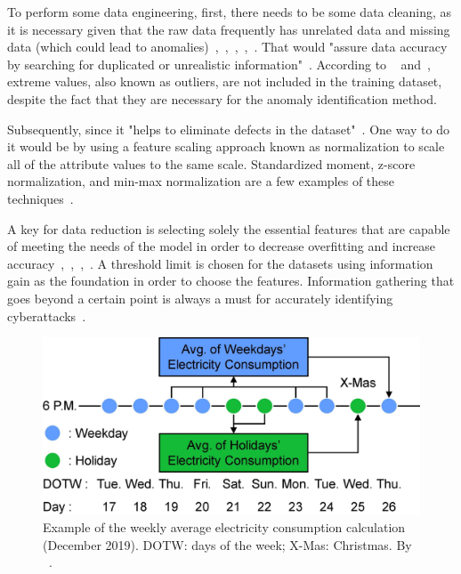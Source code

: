 \documentclass[a4paper,12pt,twoside]{ThesisStyle}
\begin{document}
To perform some data engineering, first, there needs to be some data cleaning, as it is necessary given that the raw data frequently has unrelated data and missing data (which could lead to anomalies)~\cite{Bawaneh2019traffic},~\cite{du2019clustering},~\cite{Nugraha2021rail},~\cite{bachechi2022big},~\cite{hangan2022advanced}. That would "assure data accuracy by searching for duplicated or unrealistic information"~\cite{yadav2023augmentation}. According to ~\cite{cerquitelli2017predicting} and~\cite{abd2022analyze}, extreme values, also known as outliers, are not included in the training dataset, despite the fact that they are necessary for the anomaly identification method.

Subsequently, since it "helps to eliminate defects in the dataset"~\cite{saheed2022machine}. One way to do it would be by using a feature scaling approach known as normalization to scale all of the attribute values to the same scale. Standardized moment, z-score normalization, and min-max normalization are a few examples of these techniques~\cite{Carbone2017heating}.

A key for data reduction is selecting solely the essential features that are capable of meeting the needs of the model in order to decrease overfitting and increase accuracy~\cite{Wang2017Taxis},~\cite{ali2020data},~\cite{protic2022cybersecurity},~\cite{alsalemi2023modular}. A threshold limit is chosen for the datasets using information gain as the foundation in order to choose the features. Information gathering that goes beyond a certain point is always a must for accurately identifying cyberattacks~\cite{bukhari2023anomaly}. 

\begin{figure}[hbt]
\centering
\includegraphics[width=13 cm]{imatges/calendarMoon.jpeg}
\caption{\label{fig:calendarMoon} Example of the weekly average electricity consumption calculation (December 2019). DOTW: days of the week; X-Mas: Christmas. By ~\cite{moon2022toward}.}
\end{figure}
\end{document}

